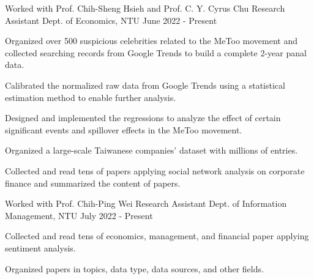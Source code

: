 

\begin{cventries}

  \cventry
    {Worked with Prof. Chih-Sheng Hsieh and Prof. C. Y. Cyrus Chu} %
    {Research Assistant} %
    {Dept. of Economics, NTU} %
    {June 2022 - Present} %
    {
        \begin{cvitems}
        \item {Organized over 500 suspicious celebrities 
            related to the MeToo movement
            and collected searching records from Google Trends 
            to build a complete 2-year panal data.}
        \item {Calibrated the normalized raw data from Google Trends
            using a statistical estimation method
            to enable further analysis.}
        \item {Designed and implemented the regressions 
            to analyze the effect of certain significant events and 
            spillover effects in the MeToo movement.}
        \item {Organized a large-scale Taiwanese companies' dataset
            with millions of entries.}
        \item {Collected and read tens of papers applying
            social network analysis on corporate finance
            and summarized the content of papers.}
        \end{cvitems}
    }

    \cventry
    {Worked with Prof. Chih-Ping Wei} %
    {Research Assistant} %
    {Dept. of Information Management, NTU} %
    {July 2022 - Present} %
    {
        \begin{cvitems}
        \item Collected and read tens of economics, management,
            and financial paper applying sentiment analysis.
        \item Organized papers in topics, data type,
            data sources, and other fields.
        \end{cvitems}
    }


\end{cventries}
